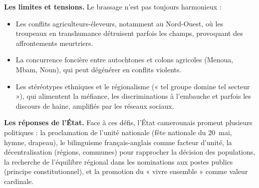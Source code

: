 \documentclass[11pt]{article}
\newcommand{\cle}[1]{{\popxbold\color{popdark}#1}}
\begin{document}
\textbf{Les limites et tensions.} Le brassage n'est pas toujours harmonieux :

\begin{itemize}
\item Les \cle{conflits agriculteurs-éleveurs}, notamment au \cle{Nord-Ouest}, où les troupeaux en transhumance détruisent parfois les champs, provoquant des affrontements meurtriers.
\item La \cle{concurrence foncière} entre autochtones et colons agricoles (Menoua, Mbam, Noun), qui peut dégénérer en conflits violents.
\item Les \cle{stéréotypes ethniques} et le \cle{régionalisme} (« tel groupe domine tel secteur »), qui alimentent la méfiance, les discriminations à l'embauche et parfois les discours de haine, amplifiés par les réseaux sociaux.
\end{itemize}

\textbf{Les réponses de l'État.} Face à ces défis, l'État camerounais promeut plusieurs politiques : la proclamation de l'\cle{unité nationale} (fête nationale du 20~mai, hymne, drapeau), le \cle{bilinguisme} français-anglais comme facteur d'unité, la \cle{décentralisation} (régions, communes) pour rapprocher la décision des populations, la recherche de l'\cle{équilibre régional} dans les nominations aux postes publics (principe constitutionnel), et la promotion du « \cle{vivre ensemble} » comme valeur cardinale.
\end{document}
